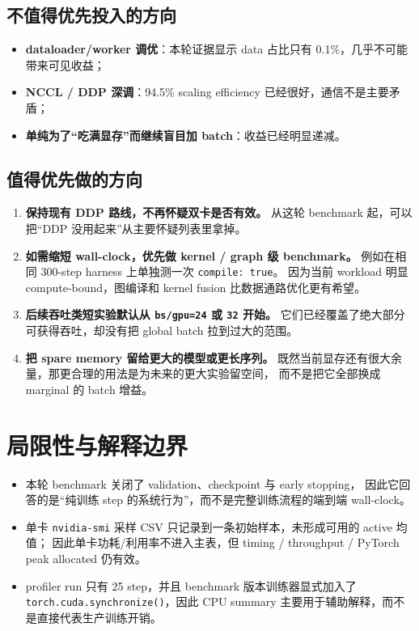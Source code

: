 \documentclass[11pt,a4paper]{ctexart}
\begin{document}
\subsection{不值得优先投入的方向}

\begin{itemize}[leftmargin=2em]
  \item \textbf{dataloader/worker 调优}：本轮证据显示 data 占比只有 0.1\%，几乎不可能带来可见收益；
  \item \textbf{NCCL / DDP 深调}：94.5\% scaling efficiency 已经很好，通信不是主要矛盾；
  \item \textbf{单纯为了“吃满显存”而继续盲目加 batch}：收益已经明显递减。
\end{itemize}

\subsection{值得优先做的方向}

\begin{enumerate}[leftmargin=2em]
  \item \textbf{保持现有 DDP 路线，不再怀疑双卡是否有效。}
  从这轮 benchmark 起，可以把“DDP 没用起来”从主要怀疑列表里拿掉。

  \item \textbf{如需缩短 wall-clock，优先做 kernel / graph 级 benchmark。}
  例如在相同 300-step harness 上单独测一次 \texttt{compile: true}。
  因为当前 workload 明显 compute-bound，图编译和 kernel fusion 比数据通路优化更有希望。

  \item \textbf{后续吞吐类短实验默认从 \texttt{bs/gpu=24} 或 \texttt{32} 开始。}
  它们已经覆盖了绝大部分可获得吞吐，却没有把 global batch 拉到过大的范围。

  \item \textbf{把 spare memory 留给更大的模型或更长序列。}
  既然当前显存还有很大余量，那更合理的用法是为未来的更大实验留空间，
  而不是把它全部换成 marginal 的 batch 增益。
\end{enumerate}

\section{局限性与解释边界}

\begin{itemize}[leftmargin=2em]
  \item 本轮 benchmark 关闭了 validation、checkpoint 与 early stopping，
  因此它回答的是“纯训练 step 的系统行为”，而不是完整训练流程的端到端 wall-clock。
  \item 单卡 \texttt{nvidia-smi} 采样 CSV 只记录到一条初始样本，未形成可用的 active 均值；
  因此单卡功耗/利用率不进入主表，但 timing / throughput / PyTorch peak allocated 仍有效。
  \item profiler run 只有 25 step，并且 benchmark 版本训练器显式加入了
  \texttt{torch.cuda.synchronize()}，因此 CPU summary 主要用于辅助解释，而不是直接代表生产训练开销。
\end{itemize}
\end{document}
